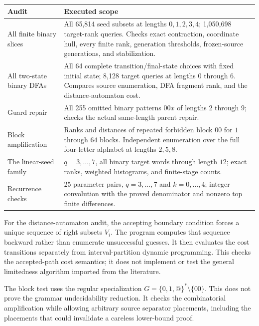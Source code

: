 \documentclass[11pt,letterpaper]{article}
\makeatletter
\theoremstyle{definition}
\theoremstyle{remark}
\newcommand{\guard}{\mathtt{@}}
\makeatother
\begin{document}
\begin{center}\small
\begin{tabular}{@{}p{}p{}@{}}
\toprule
\textbf{Audit} & \textbf{Executed scope}\\
\midrule
All finite binary slices &
All 65,814 seed subsets at lengths $0,1,2,3,4$; 1,050,698 target-rank queries.
Checks exact contraction, coordinate hull, every finite rank, generation
thresholds, frozen-source generations, and stabilization.\\[4pt]
All two-state binary DFAs &
All 64 complete transition/final-state choices with fixed initial state;
8,128 target queries at lengths $0$ through $6$. Compares source enumeration,
DFA fragment rank, and the distance-automaton cost.\\[4pt]
Guard repair &
All 255 omitted binary patterns $00x$ of lengths $2$ through $9$; checks the
actual same-length parent repair.\\[4pt]
Block amplification &
Ranks and distances of repeated forbidden block $00$ for $1$ through $64$
blocks. Independent enumeration over the full four-letter alphabet at
lengths $2,5,8$.\\[4pt]
The linear-seed family &
$q=3,\ldots,7$, all binary target words through length $12$; exact ranks,
weighted histograms, and finite-stage counts.\\[4pt]
Recurrence checks &
25 parameter pairs, $q=3,\ldots,7$ and $k=0,\ldots,4$; integer convolution
with the proved denominator and nonzero top finite differences.\\
\bottomrule
\end{tabular}
\end{center}

For the distance-automaton audit, the accepting boundary condition forces a
unique sequence of right subsets $V_i$. The program computes that sequence
backward rather than enumerate unsuccessful guesses. It then evaluates the
cost transitions separately from interval-partition dynamic programming.
This checks the accepted-path cost semantics; it does not implement or test
the general limitedness algorithm imported from the literature.

The block test uses the regular specialization
$G=\{0,1,\guard\}^*\setminus\{00\}$. This does not prove the grammar
undecidability reduction. It checks the combinatorial amplification while
allowing arbitrary source separator placements, including the placements
that could invalidate a careless lower-bound proof.
\end{document}
